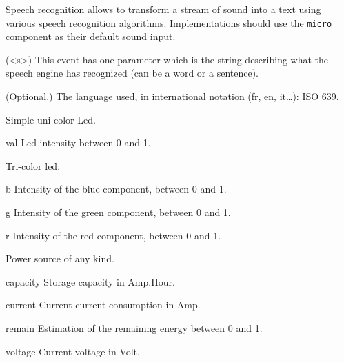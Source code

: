 
Speech recognition allows to transform a stream of sound into a text
using various speech recognition algorithms. Implementations
should use the \lstinline{micro} component as their default sound input.

\begin{urbiscriptapi}
\item[hear](<s>) This event has one parameter which is the string describing
  what the speech engine has recognized (can be a word or a sentence).


\item[lang]{} (Optional.)  The language used, in international notation (fr,
  en, it…): ISO 639.
\end{urbiscriptapi}


Simple uni-color Led.

\begin{urbiscriptapi}
\item[val] Led intensity between 0 and 1.
\end{urbiscriptapi}


Tri-color led.

\begin{urbiscriptapi}
\item[b] Intensity of the blue component, between 0 and 1.


\item[g] Intensity of the green component, between 0 and 1.


\item[r] Intensity of the red component, between 0 and 1.
\end{urbiscriptapi}



Power source of any kind.

\begin{urbiscriptapi}
\item[capacity] Storage capacity in Amp.Hour.


\item[current] Current current consumption in Amp.


\item[remain] Estimation of the remaining energy between 0 and 1.


\item[voltage] Current voltage in Volt.
\end{urbiscriptapi}


